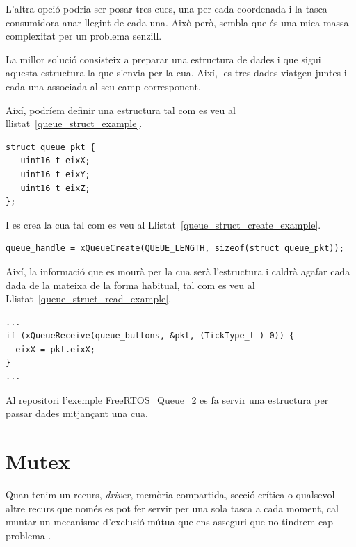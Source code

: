 L'altra opció podria ser posar tres cues, una per cada coordenada i la tasca consumidora anar llegint de cada una. Això però, sembla que és una mica massa complexitat per un problema senzill.

La millor solució consisteix a preparar una estructura de dades i que sigui aquesta estructura la que s'envia per la cua. Així, les tres dades viatgen juntes i cada una associada al seu camp corresponent.

Així, podríem definir una estructura tal com es veu al llistat~\ref{queue_struct_example}.

\begin{lstlisting}[style=customc, label=queue_struct_example, caption=Paquet dins d'estructura,floatplacement=h! ]
struct queue_pkt {
   uint16_t eixX;
   uint16_t eixY;
   uint16_t eixZ;
};
\end{lstlisting}

I es crea la cua tal com es veu al Llistat~\ref{queue_struct_create_example}.

\begin{lstlisting}[style=customc, label=queue_struct_create_example, caption=Creació de la cua amb un paquet de dades,floatplacement=h!]
queue_handle = xQueueCreate(QUEUE_LENGTH, sizeof(struct queue_pkt));
\end{lstlisting}


Així, la informació que es mourà per la cua serà l'estructura i caldrà agafar cada dada de la mateixa de la forma habitual, tal com es veu al Llistat~\ref{queue_struct_read_example}.

\begin{lstlisting}[style=customc, label=queue_struct_read_example, caption=Rebre un paquet de dades de la cua]
...
if (xQueueReceive(queue_buttons, &pkt, (TickType_t ) 0)) {
  eixX = pkt.eixX;
}
...
\end{lstlisting}

Al \href{https://github.com/mariusmm/cursembedded/tree/master/Simplicity/FreeRTOS_Queue_2}{repositori} l'exemple FreeRTOS\_Queue\_2 es fa servir una estructura per passar dades mitjançant una cua.


\section{Mutex}
\label{sec:Mutex}
Quan tenim un recurs, {\em driver}, memòria compartida, secció crítica o qualsevol altre recurs que només es pot fer servir per una sola tasca a cada moment, cal muntar un mecanisme d'exclusió mútua que ens asseguri que no tindrem cap problema \cite[244]{FreeRTOSBook}.

